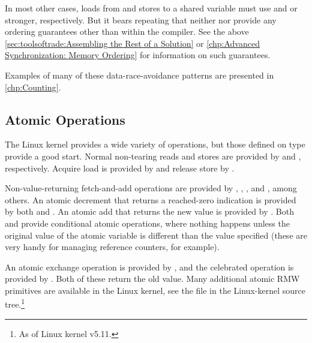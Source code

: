 \QuickQuizEnd

In most other cases, loads from and stores to a shared variable must
use  and  or stronger, respectively.
But it bears repeating that neither  nor 
provide any ordering guarantees other than within the compiler.
See the above
\cref{sec:toolsoftrade:Assembling the Rest of a Solution} or
\cref{chp:Advanced Synchronization: Memory Ordering}
for information on such guarantees.

Examples of many of these data-race-avoidance patterns are presented in
\cref{chp:Counting}.

\subsection{Atomic Operations}
\label{sec:toolsoftrade:Atomic Operations}

The Linux kernel provides a wide variety of  operations, but
those defined on type  provide a good start.
Normal non-tearing reads and stores are provided by
 and , respectively.
Acquire load is provided by  and release
store by .

Non-value-returning fetch-and-add operations are provided by
, , , and
, among others.
An atomic decrement that returns a reached-zero indication is provided
by both  and .
An atomic add that returns the new value is provided by
.
Both  and  provide
conditional atomic operations, where nothing happens unless the
original value of the atomic variable is different than the value
specified (these are very handy for managing reference counters, for
example).

An atomic exchange operation is provided by , and
the celebrated  operation is provided by
.
Both of these return the old value.
Many additional atomic RMW primitives are available in the Linux kernel,
see the  file in the Linux-kernel
source tree.\footnote{
	As of Linux kernel v5.11.
}

